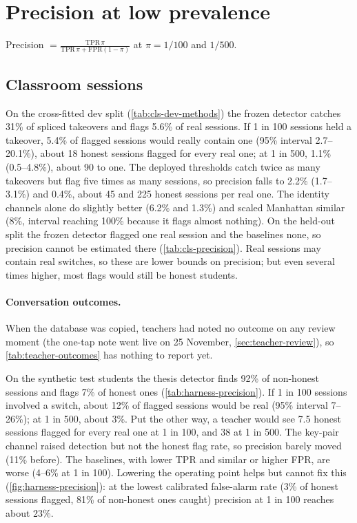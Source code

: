 \section{Precision at low prevalence}
Precision $= \frac{\mathrm{TPR}\,\pi}{\mathrm{TPR}\,\pi + \mathrm{FPR}(1-\pi)}$
at $\pi = 1/100$ and $1/500$.

\subsection*{Classroom sessions}
On the cross-fitted dev split (\cref{tab:cls-dev-methods}) the frozen detector catches 31\%
of spliced takeovers and flags 5.6\% of real sessions. If 1 in 100 sessions held a takeover,
5.4\% of flagged sessions would really contain one (95\% interval 2.7--20.1\%), about 18 honest
sessions flagged for every real one; at 1 in 500, 1.1\% (0.5--4.8\%), about 90 to one. The
deployed thresholds catch twice as many takeovers but flag five times as many sessions, so
precision falls to 2.2\% (1.7--3.1\%) and 0.4\%, about 45 and 225 honest sessions per real
one. The identity channels alone do slightly better (6.2\% and 1.3\%) and scaled Manhattan
similar (8\%, interval reaching 100\% because it flags almost nothing). On the held-out split
the frozen detector flagged one real session and the baselines none, so precision cannot be
estimated there (\cref{tab:cls-precision}). Real sessions may contain real switches, so these
are lower bounds on precision; but even several times higher, most flags would still be honest
students.

\paragraph{Conversation outcomes.} When the database was copied, teachers had noted no
outcome on any review moment (the one-tap note went live on 25 November,
\cref{sec:teacher-review}), so \cref{tab:teacher-outcomes} has nothing to report yet.



On the synthetic test students the thesis detector finds 92\% of non-honest
sessions and flags 7\% of honest ones (\cref{tab:harness-precision}). If 1 in 100
sessions involved a switch, about 12\% of flagged sessions would be real (95\%
interval 7--26\%); at 1 in 500, about 3\%. Put the other way, a teacher would
see 7.5 honest sessions flagged for every real one at 1 in 100, and 38 at 1 in
500. The key-pair channel raised detection but not the honest flag rate, so
precision barely moved (11\% before). The baselines, with lower TPR and similar
or higher FPR, are worse (4--6\% at 1 in 100). Lowering the operating point
helps but cannot fix this (\cref{fig:harness-precision}): at the lowest
calibrated false-alarm rate (3\% of honest sessions flagged, 81\% of
non-honest ones caught) precision at 1 in 100 reaches about 23\%.

